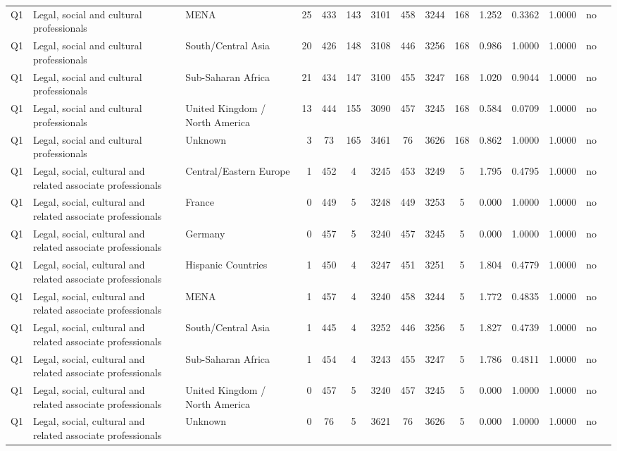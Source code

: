 \begin{longtable}{lllrcccccccccll}
Q1 & Legal, social and cultural professionals & MENA & 25 & 433 & 143 & 3101 & 458 & 3244 & 168 & 1.252 & 0.3362 & 1.0000 & no \\
Q1 & Legal, social and cultural professionals & South/Central Asia & 20 & 426 & 148 & 3108 & 446 & 3256 & 168 & 0.986 & 1.0000 & 1.0000 & no \\
Q1 & Legal, social and cultural professionals & Sub-Saharan Africa & 21 & 434 & 147 & 3100 & 455 & 3247 & 168 & 1.020 & 0.9044 & 1.0000 & no \\
Q1 & Legal, social and cultural professionals & United Kingdom / North America & 13 & 444 & 155 & 3090 & 457 & 3245 & 168 & 0.584 & 0.0709 & 1.0000 & no \\
Q1 & Legal, social and cultural professionals & Unknown & 3 & 73 & 165 & 3461 & 76 & 3626 & 168 & 0.862 & 1.0000 & 1.0000 & no \\
Q1 & Legal, social, cultural and related associate professionals & Central/Eastern Europe & 1 & 452 & 4 & 3245 & 453 & 3249 & 5 & 1.795 & 0.4795 & 1.0000 & no \\
Q1 & Legal, social, cultural and related associate professionals & France & 0 & 449 & 5 & 3248 & 449 & 3253 & 5 & 0.000 & 1.0000 & 1.0000 & no \\
Q1 & Legal, social, cultural and related associate professionals & Germany & 0 & 457 & 5 & 3240 & 457 & 3245 & 5 & 0.000 & 1.0000 & 1.0000 & no \\
Q1 & Legal, social, cultural and related associate professionals & Hispanic Countries & 1 & 450 & 4 & 3247 & 451 & 3251 & 5 & 1.804 & 0.4779 & 1.0000 & no \\
Q1 & Legal, social, cultural and related associate professionals & MENA & 1 & 457 & 4 & 3240 & 458 & 3244 & 5 & 1.772 & 0.4835 & 1.0000 & no \\
Q1 & Legal, social, cultural and related associate professionals & South/Central Asia & 1 & 445 & 4 & 3252 & 446 & 3256 & 5 & 1.827 & 0.4739 & 1.0000 & no \\
Q1 & Legal, social, cultural and related associate professionals & Sub-Saharan Africa & 1 & 454 & 4 & 3243 & 455 & 3247 & 5 & 1.786 & 0.4811 & 1.0000 & no \\
Q1 & Legal, social, cultural and related associate professionals & United Kingdom / North America & 0 & 457 & 5 & 3240 & 457 & 3245 & 5 & 0.000 & 1.0000 & 1.0000 & no \\
Q1 & Legal, social, cultural and related associate professionals & Unknown & 0 & 76 & 5 & 3621 & 76 & 3626 & 5 & 0.000 & 1.0000 & 1.0000 & no \\

\end{longtable}
